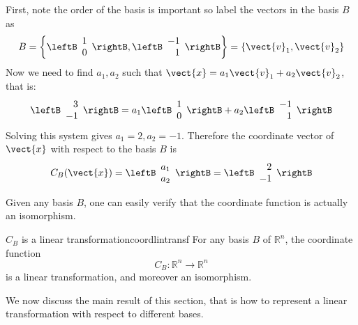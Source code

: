 \begin{solution}
First, note the order of the basis is important so label the vectors in the basis $B$ as 
\[
B = \left\{ \leftB \begin{array}{r}
1 \\
0 
\end{array} \rightB, \leftB \begin{array}{r}
-1 \\
1
\end{array} \rightB \right\} = \left\{ \vect{v}_1, \vect{v}_2 \right\} \]
Now we need to find $a_1, a_2$ such that $\vect{x} = a_1 \vect{v}_1 + a_2 \vect{v}_2$, that is:
\[
\leftB
\begin{array}{r}
3 \\
-1
\end{array}
\rightB
=
a_1 
\leftB \begin{array}{r}
1 \\
0 
\end{array} \rightB
+ a_2
\leftB \begin{array}{r}
-1 \\
1 
\end{array} \rightB\]
Solving this system gives $a_1 = 2, a_2 = -1$. Therefore the coordinate vector of $\vect{x}$ with respect to the basis $B$ is 
\[
C_B(\vect{x})
=
\leftB \begin{array}{r}
a_1 \\
a_2 
\end{array}\rightB
= \leftB \begin{array}{r}
2 \\
-1 
\end{array} \rightB
\]
\end{solution}

Given any basis $B$, one can easily verify that the coordinate function is actually an isomorphism. 

\begin{theorem}{$C_B$ is a linear transformation}{coordlintransf}
For any basis $B$ of $\mathbb{R}^n$, the coordinate function
\[ C_B: \mathbb{R}^n  \rightarrow \mathbb{R}^n  \]
is a linear transformation, and moreover an isomorphism. 
\end{theorem}

We now discuss the main  result  of this section, that is how
to represent a linear transformation with respect to different
bases.

